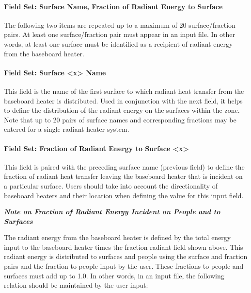 \paragraph{Field Set: Surface Name, Fraction of Radiant Energy to Surface}\label{field-set-surface-name-fraction-of-radiant-energy-to-surface-2}

The following two items are repeated up to a maximum of 20 surface/fraction pairs. At least one surface/fraction pair must appear in an input file. In other words, at least one surface must be identified as a recipient of radiant energy from the baseboard heater.

\paragraph{Field Set: Surface \textless{}x\textgreater{} Name}\label{field-set-surface-x-name}

This field is the name of the first surface to which radiant heat transfer from the baseboard heater is distributed. Used in conjunction with the next field, it helps to define the distribution of the radiant energy on the surfaces within the zone. Note that up to 20 pairs of surface names and corresponding fractions may be entered for a single radiant heater system.

\paragraph{Field Set: Fraction of Radiant Energy to Surface \textless{}x\textgreater{}}\label{field-set-fraction-of-radiant-energy-to-surface-x}

This field is paired with the preceding surface name (previous field) to define the fraction of radiant heat transfer leaving the baseboard heater that is incident on a particular surface. Users should take into account the directionality of baseboard heaters and their location when defining the value for this input field.

\textbf{\emph{Note on Fraction of Radiant Energy Incident on \hyperref[people]{People} and to Surfaces}}

The radiant energy from the baseboard heater is defined by the total energy input to the baseboard heater times the fraction radiant field shown above. This radiant energy is distributed to surfaces and people using the surface and fraction pairs and the fraction to people input by the user. These fractions to people and surfaces must add up to 1.0. In other words, in an input file, the following relation should be maintained by the user input:

